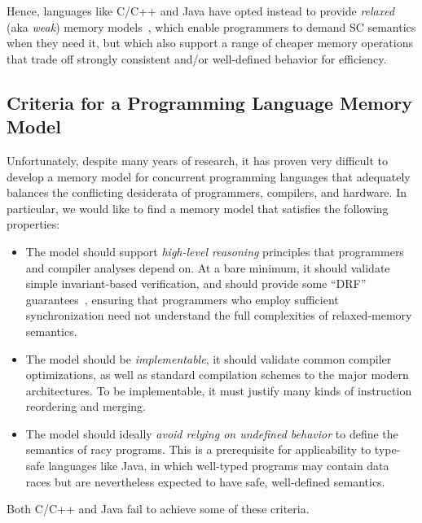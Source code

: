 Hence, languages like C/C++ and Java have opted instead to provide
\emph{relaxed} (aka \emph{weak}) memory models~\cite{jmm,c++17},
which enable programmers to demand SC semantics when they need it, but
which also support a range of cheaper memory operations that trade off
strongly consistent and/or well-defined behavior for efficiency.

\subsection{Criteria for a Programming Language Memory Model}
\label{sec:criteria}

Unfortunately, despite many years of research, it has proven very
difficult to develop a memory model for concurrent programming
languages that adequately balances the conflicting desiderata of
programmers, compilers, and hardware.  In particular, we would like to
find a memory model that satisfies the following properties:
\vspace{-.5ex}
\begin{itemize}
\item The model should support \emph{high-level reasoning} principles
  that programmers and compiler analyses depend on.  At a bare
  minimum, it should validate simple invariant-based verification, and
  should provide some ``DRF'' guarantees~\cite{Adve:1990}, ensuring that
  programmers who employ sufficient synchronization need not understand
  the full complexities of relaxed-memory semantics.\\[-2.5ex]
\item The model should be \emph{implementable}, \ie it should validate
  common compiler optimizations, as well as standard compilation
  schemes to the major modern architectures.  To be implementable, it
  must justify many kinds of instruction reordering and merging.\\[-2.5ex]
\item The model should ideally \emph{avoid relying on undefined
    behavior} to define the semantics of racy programs.  This is a
  prerequisite for applicability to type-safe languages like Java, in
  which well-typed programs may contain data races but are
  nevertheless expected to have safe, well-defined semantics.
\end{itemize}
\vspace{-.5ex}
\mbox{}\indent Both C/C++ and Java fail to achieve some of these criteria.

